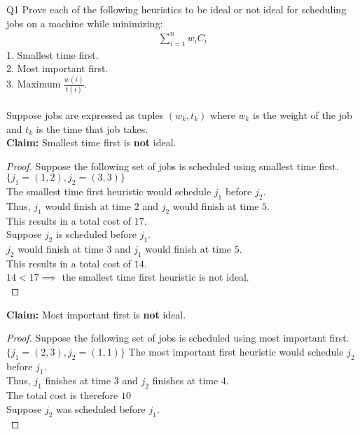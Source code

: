 \begin{problem}
  {Q1}
  Prove each of the following heuristics to be ideal or not ideal for scheduling jobs on a machine while minimizing:
  \begin{align*}
      \sum_{i = 1}^{n} w_iC_i
  \end{align*}
  1. Smallest time first. \\
  2. Most important first. \\
  3. Maximum $\frac{w(i)}{t(i)}$. \\\\
  Suppose jobs are expressed as tuples $(w_k, t_k)$ where $w_k$ is the weight of the job and $t_k$ is the time that job takes. \\
  \textbf{Claim:} Smallest time first is \textbf{not} ideal. \\
  \begin{proof}
    Suppose the following set of jobs is scheduled using smallest time first. \\
    $\{j_1 = (1, 2), j_2 = (3, 3)\}$ \\
    The smallest time first heuristic would schedule $j_1$ before $j_2$. \\
    Thus, $j_1$ would finish at time $2$ and $j_2$ would finish at time $5$. \\
    This results in a total cost of $17$. \\
    Suppose $j_2$ is scheduled before $j_1$. \\
    $j_2$ would finish at time $3$ and $j_1$ would finish at time $5$. \\
    This results in a total cost of $14$. \\
    $14 < 17 \implies$ the smallest time first heuristic is not ideal. \\
  \end{proof}
  \textbf{Claim:} Most important first is \textbf{not} ideal. \\
  \begin{proof}
    Suppose the following set of jobs is scheduled using most important first. \\
    $\{j_1 = (2, 3), j_2 = (1, 1)\}$
    The most important first heuristic would schedule $j_2$ before $j_1$. \\
    Thus, $j_1$ finishes at time $3$ and $j_2$ finishes at time $4$. \\
    The total cost is therefore $10$ \\
    Suppose $j_2$ was scheduled before $j_1$. \\

\end{proof}
\end{problem}
